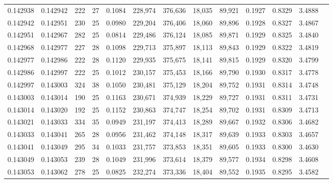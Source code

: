 \begin{tabular}{rrrrrrrrrrrrr}
0.142938 & 0.142942 & 222 &  27 &                                     0.1084 & 228,974 & 376,636 &  18,035 &  89,921 & 0.1927 & 0.8329 & 3.4888 \\
0.142942 & 0.142951 & 230 &  25 &                                     0.0980 & 229,204 & 376,406 &  18,060 &  89,896 & 0.1928 & 0.8327 & 3.4867 \\
0.142951 & 0.142967 & 282 &  25 &                                     0.0814 & 229,486 & 376,124 &  18,085 &  89,871 & 0.1929 & 0.8325 & 3.4840 \\
0.142968 & 0.142977 & 227 &  28 &                                     0.1098 & 229,713 & 375,897 &  18,113 &  89,843 & 0.1929 & 0.8322 & 3.4819 \\
0.142977 & 0.142986 & 222 &  28 &                                     0.1120 & 229,935 & 375,675 &  18,141 &  89,815 & 0.1929 & 0.8320 & 3.4799 \\
0.142986 & 0.142997 & 222 &  25 &                                     0.1012 & 230,157 & 375,453 &  18,166 &  89,790 & 0.1930 & 0.8317 & 3.4778 \\
0.142997 & 0.143003 & 324 &  38 &                                     0.1050 & 230,481 & 375,129 &  18,204 &  89,752 & 0.1931 & 0.8314 & 3.4748 \\
0.143003 & 0.143014 & 190 &  25 &                                     0.1163 & 230,671 & 374,939 &  18,229 &  89,727 & 0.1931 & 0.8311 & 3.4731 \\
0.143014 & 0.143020 & 192 &  25 &                                     0.1152 & 230,863 & 374,747 &  18,254 &  89,702 & 0.1931 & 0.8309 & 3.4713 \\
0.143021 & 0.143033 & 334 &  35 &                                     0.0949 & 231,197 & 374,413 &  18,289 &  89,667 & 0.1932 & 0.8306 & 3.4682 \\
0.143033 & 0.143041 & 265 &  28 &                                     0.0956 & 231,462 & 374,148 &  18,317 &  89,639 & 0.1933 & 0.8303 & 3.4657 \\
0.143041 & 0.143049 & 295 &  34 &                                     0.1033 & 231,757 & 373,853 &  18,351 &  89,605 & 0.1933 & 0.8300 & 3.4630 \\
0.143049 & 0.143053 & 239 &  28 &                                     0.1049 & 231,996 & 373,614 &  18,379 &  89,577 & 0.1934 & 0.8298 & 3.4608 \\
0.143053 & 0.143062 & 278 &  25 &                                     0.0825 & 232,274 & 373,336 &  18,404 &  89,552 & 0.1935 & 0.8295 & 3.4582 \\

\end{tabular}
